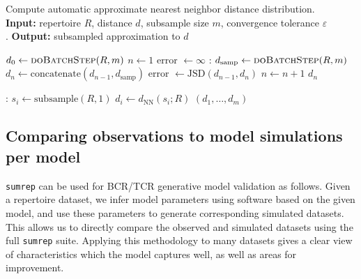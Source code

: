 \documentclass{article}
\begin{document}
\begin{algorithm}
    \caption{Compute automatic approximate nearest neighbor distance distribution.\\
        \textbf{Input:} repertoire $R$, distance $d$, subsample size $m$, convergence tolerance $\varepsilon$\\.
        \textbf{Output:} subsampled approximation to $d$}
    \label{NNDistributionAveraging}
    \begin{algorithmic}
        \State $d_0 \gets \Call{doBatchStep}{R, m}$
        \State $n \gets 1$
        \State error $\gets \infty$
        :
        	\State $d_\text{samp} \gets \Call{doBatchStep}{R, m}$
        	\State $d_n \gets \text{concatenate}(d_{n-1}, d_\text{samp})$
        	\State error $\gets \text{JSD}(d_{n-1}, d_n)$
        	\State $n \gets n + 1$
        \EndWhile
            \Return $d_n$
    \end{algorithmic}
    \begin{algorithmic}
    :
		\State $s_i \gets \text{subsample}(R, 1)$
        \State $d_i \gets d_\text{NN}(s_i; R)$
	\EndFor
	\Return $(d_1, \dotsc, d_m)$
	\EndFunction
    \end{algorithmic}
\end{algorithm}



\subsection*{Comparing observations to model simulations per model}
\texttt{sumrep} can be used for BCR/TCR generative model validation as follows.
Given a repertoire dataset, we infer model parameters using software based on the given model, and use these parameters to generate corresponding simulated datasets.
This allows us to directly compare the observed and simulated datasets using the full \texttt{sumrep} suite.
Applying this methodology to many datasets gives a clear view of characteristics which the model captures well, as well as areas for improvement.
\end{document}
